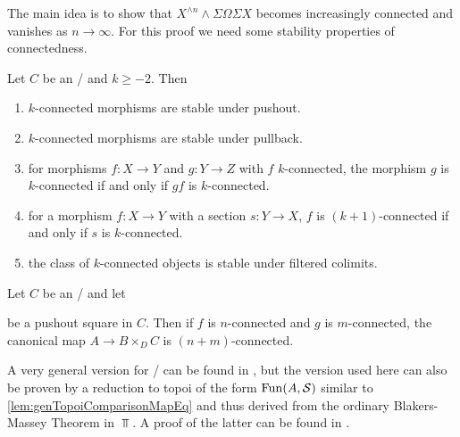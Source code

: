 The main idea is to show that $X^{\wedge n}\wedge\Sigma\Omega\Sigma X$ becomes increasingly connected and vanishes as $n\to\infty$.
For this proof we need some stability properties of connectedness.
\begin{prop}\label{prop:conn}
    Let $C$ be an \inftytop/ and $k\geq -2$.
    Then
    \begin{enumerate}[label={(\roman*)}]
        \item $k$-connected morphisms are stable under pushout. \label{prop:connStableUnderPo}
        \item $k$-connected morphisms are stable under pullback.\label{prop:connStableUnderPb}
        \item for morphisms $f\colon X\to Y$ and $g\colon Y\to Z$ with $f$ $k$-connected, the morphism $g$ is $k$-connected if and only if $gf$ is $k$-connected. \label{prop:connRightCancel}
        \item for a morphism $f\colon X\to Y$ with a section $s\colon Y\to X$, $f$ is $(k+1)$-connected if and only if $s$ is $k$-connected. \label{prop:connSection}
        \item the class of $k$-connected objects is stable under filtered colimits. \label{prop:connStableFilteredColim}
    \end{enumerate}
    \begin{reference}
        \cite[Proposition 4.10]{splittings_21}
    \end{reference}
\end{prop}
\begin{thm}\label{prop:blakersMassey}
    Let $C$ be an \inftytop/ and let 
    \begin{center}
    \end{center}
    be a pushout square in $C$.
    Then if $f$ is $n$-connected and $g$ is $m$-connected, the canonical map $A\to B\times_{D}C$ is $(n+m)$-connected.
    \begin{reference}
        A very general version for \inftytops/ can be found in \cite[Corollary 4.3.1]{gen_blakers_massey}, but the version used here can also be proven by a reduction to topoi of the form $\operatorname{Fun}(A,\mathcal{S})$ similar to \cref{lem:genTopoiComparisonMapEq} and thus derived from the ordinary Blakers-Massey Theorem in $\Top$.
        A proof of the latter can be found in \cite[Proposition 8.16]{toposes_and_htpy_toposes}.
    \end{reference}
\end{thm}
